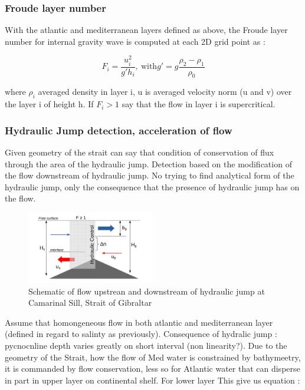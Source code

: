 
\subsubsection{Froude layer number}

With the atlantic and mediterranean layers defined as above, the Froude layer number for internal gravity wave is computed at each 2D grid point as : 

\begin{equation}
F_i=\frac{u_i^2}{g'h_i} , \ \text{with} g'=g \frac{\rho_2-\rho_1}{\rho_0}
\end{equation}

where $\rho_i$ averaged density in layer i,  u is averaged velocity norm (u and v) over the layer i of height h. If $F_i>1$ say that the flow in layer i is supercritical.


\subsubsection{Hydraulic Jump detection, acceleration of flow}
Given geometry of the strait can say that condition of conservation of flux through the area of the hydraulic jump. 
Detection based on the modification of the flow downstream of hydraulic jump. No trying to find analytical form of the hydraulic jump, only the consequence that the presence of hydraulic jump has on the flow.

\begin{figure}[!h]
 \centering
 \includegraphics[width=0.5\textwidth]{./GBR3D/schema_diagressaut.jpg}
 \caption {Schematic of flow upstrean and downstream of hydraulic jump at Camarinal Sill, Strait of Gibraltar}
  \label{schemaRH}
\end{figure}


Assume that homongeneous flow in both atlantic and mediterranean layer (defined in regard to salinty as previously). Consequence of hydralic jump : pycnocnline depth varies greatly on short interval (non linearity?). Due to the geometry of the Strait, how the flow of Med water is constrained by bathymeetry, it is commanded by flow conservation, less so for Atlantic water that can disperse in part in upper layer on continental shelf. For lower layer This give us equation :

